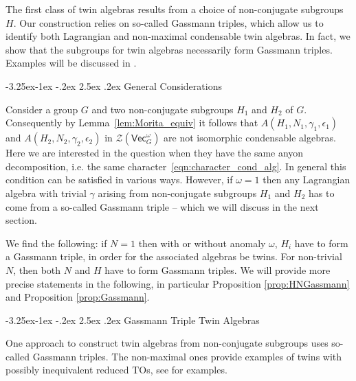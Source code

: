 \documentclass[aps,twocolumn,prx,floatfix,preprintnumbers, nofootinbib,10pt]{revtex4-2}
\makeatletter
\numberwithin{equation}{section}
\theoremstyle{definition}
\newcommand{\be}{\begin{equation}}
\newcommand{\ee}{\end{equation}}
\newcommand{\Ind}{\text{Ind}}
\newcommand{\cZ}{\mathcal{Z}}
\renewcommand{\Vec}{\mathsf{Vec}}
\newcommand{\eps}{\epsilon}
\renewcommand\subsubsection{\@startsection{subsubsection}{3}{\z@}%
                                     {-3.25ex\@plus -1ex \@minus -.2ex}%
                                     {2.5ex \@plus .2ex}%
                                     {\centering\itshape\bfseries\small}}
\makeatother
\begin{document}
The first class of twin algebras results from a choice of non-conjugate subgroups $H$. Our construction relies on so-called Gassmann triples, which allow us to identify both Lagrangian and non-maximal condensable twin algebras. {In fact, we show that the subgroups for twin algebras necessarily form Gassmann triples.} Examples will be discussed in .





\subsubsection{General Considerations}

Consider a group $G$ and two non-conjugate subgroups $H_1$ and $H_2$ of $G$. 
Consequently by Lemma~\ref{lem:Morita_equiv} it follows that  $A(H_1,N_1,\gamma_1,\eps_1)$ and $A(H_2, N_2, \gamma_2, \eps_2)$ in $\cZ(\Vec_G^\omega)$ are not isomorphic condensable algebras. 
Here we are interested in the question when they have the same anyon decomposition, i.e. the same character~\eqref{eqn:character_cond_alg}.
{In general this condition can be satisfied in various ways. However, if $\omega=1$ then any Lagrangian algebra with trivial $\gamma$ arising from non-conjugate subgroups $H_1$ and $H_2$ has to come from a so-called Gassmann triple -- which we will discuss in the next section.}


{We find the following: 
if $N=1$  then with or without anomaly $\omega$, $H_i$ have to form a Gassmann triple, in order for the associated algebras be twins. 
For non-trivial $N$, then both $N$ and $H$ have to form Gassmann triples.}
We will provide more precise statements in the following, in particular Proposition \ref{prop:HNGassmann} and Proposition \ref{prop:Gassmann}.




\subsubsection{Gassmann Triple Twin Algebras} \label{sec:Gassman}

One approach to construct twin algebras from non-conjugate subgroups uses so-called Gassmann triples.
 The non-maximal ones provide examples of twins with possibly inequivalent reduced TOs, see  for examples.
\end{document}
